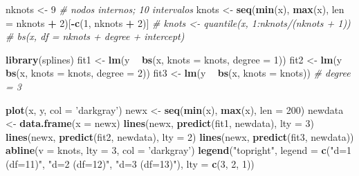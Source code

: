 \documentclass[
]{book}
\newenvironment{Shaded}{\begin{snugshade}}{\end{snugshade}}
\newcommand{\CommentTok}[1]{\textcolor[rgb]{0.56,0.35,0.01}{\textit{#1}}}
\newcommand{\DataTypeTok}[1]{\textcolor[rgb]{0.13,0.29,0.53}{#1}}
\newcommand{\DecValTok}[1]{\textcolor[rgb]{0.00,0.00,0.81}{#1}}
\newcommand{\KeywordTok}[1]{\textcolor[rgb]{0.13,0.29,0.53}{\textbf{#1}}}
\newcommand{\NormalTok}[1]{#1}
\newcommand{\OperatorTok}[1]{\textcolor[rgb]{0.81,0.36,0.00}{\textbf{#1}}}
\newcommand{\StringTok}[1]{\textcolor[rgb]{0.31,0.60,0.02}{#1}}
\theoremstyle{break}
\theoremstyle{definition}
\theoremstyle{definition}
\theoremstyle{definition}
\theoremstyle{remark}
\begin{document}
\begin{Shaded}
\begin{Highlighting}[]
\NormalTok{nknots <-}\StringTok{ }\DecValTok{9} \CommentTok{# nodos internos; 10 intervalos}
\NormalTok{knots <-}\StringTok{ }\KeywordTok{seq}\NormalTok{(}\KeywordTok{min}\NormalTok{(x), }\KeywordTok{max}\NormalTok{(x), }\DataTypeTok{len =}\NormalTok{ nknots }\OperatorTok{+}\StringTok{ }\DecValTok{2}\NormalTok{)[}\OperatorTok{-}\KeywordTok{c}\NormalTok{(}\DecValTok{1}\NormalTok{, nknots }\OperatorTok{+}\StringTok{ }\DecValTok{2}\NormalTok{)]}
\CommentTok{# knots <- quantile(x, 1:nknots/(nknots + 1)) # bs(x, df = nknots + degree + intercept)}

\KeywordTok{library}\NormalTok{(splines)}
\NormalTok{fit1 <-}\StringTok{ }\KeywordTok{lm}\NormalTok{(y }\OperatorTok{~}\StringTok{ }\KeywordTok{bs}\NormalTok{(x, }\DataTypeTok{knots =}\NormalTok{ knots, }\DataTypeTok{degree =} \DecValTok{1}\NormalTok{))}
\NormalTok{fit2 <-}\StringTok{ }\KeywordTok{lm}\NormalTok{(y }\OperatorTok{~}\StringTok{ }\KeywordTok{bs}\NormalTok{(x, }\DataTypeTok{knots =}\NormalTok{ knots, }\DataTypeTok{degree =} \DecValTok{2}\NormalTok{))}
\NormalTok{fit3 <-}\StringTok{ }\KeywordTok{lm}\NormalTok{(y }\OperatorTok{~}\StringTok{ }\KeywordTok{bs}\NormalTok{(x, }\DataTypeTok{knots =}\NormalTok{ knots)) }\CommentTok{# degree = 3}

\KeywordTok{plot}\NormalTok{(x, y, }\DataTypeTok{col =} \StringTok{'darkgray'}\NormalTok{)}
\NormalTok{newx <-}\StringTok{ }\KeywordTok{seq}\NormalTok{(}\KeywordTok{min}\NormalTok{(x), }\KeywordTok{max}\NormalTok{(x), }\DataTypeTok{len =} \DecValTok{200}\NormalTok{)}
\NormalTok{newdata <-}\StringTok{ }\KeywordTok{data.frame}\NormalTok{(}\DataTypeTok{x =}\NormalTok{ newx)}
\KeywordTok{lines}\NormalTok{(newx, }\KeywordTok{predict}\NormalTok{(fit1, newdata), }\DataTypeTok{lty =} \DecValTok{3}\NormalTok{)}
\KeywordTok{lines}\NormalTok{(newx, }\KeywordTok{predict}\NormalTok{(fit2, newdata), }\DataTypeTok{lty =} \DecValTok{2}\NormalTok{)}
\KeywordTok{lines}\NormalTok{(newx, }\KeywordTok{predict}\NormalTok{(fit3, newdata))}
\KeywordTok{abline}\NormalTok{(}\DataTypeTok{v =}\NormalTok{ knots, }\DataTypeTok{lty =} \DecValTok{3}\NormalTok{, }\DataTypeTok{col =} \StringTok{'darkgray'}\NormalTok{)}
\KeywordTok{legend}\NormalTok{(}\StringTok{"topright"}\NormalTok{, }\DataTypeTok{legend =} \KeywordTok{c}\NormalTok{(}\StringTok{"d=1 (df=11)"}\NormalTok{, }\StringTok{"d=2 (df=12)"}\NormalTok{, }\StringTok{"d=3 (df=13)"}\NormalTok{), }
       \DataTypeTok{lty =} \KeywordTok{c}\NormalTok{(}\DecValTok{3}\NormalTok{, }\DecValTok{2}\NormalTok{, }\DecValTok{1}\NormalTok{))}
\end{Highlighting}
\end{Shaded}
\end{document}
